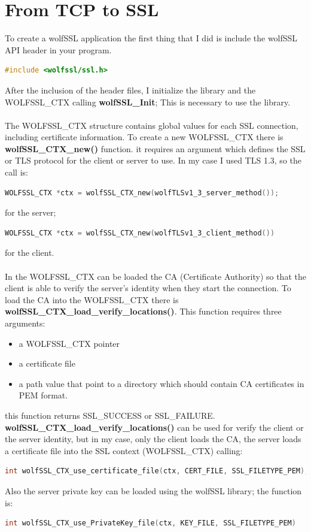 \documentclass[a4paper,12pt]{report}
\begin{document}
\section{From TCP to SSL}
To create a wolfSSL application the first thing that I did is include the wolfSSL API header in your program.
\begin{lstlisting}[language=c]
#include <wolfssl/ssl.h>
\end{lstlisting}
After the inclusion of the header files, I initialize the library and the WOLFSSL\_CTX calling \textbf{wolfSSL\_Init}; This is necessary to use the library.
\\\\ The WOLFSSL\_CTX structure contains global values for each SSL connection, including certificate information.
To create a new WOLFSSL\_CTX there is \textbf{wolfSSL\_CTX\_new()} function. it requires an argument which defines the SSL or TLS protocol for the client or server to use. In my case I used TLS 1.3, so the call is: 
\begin{lstlisting}[language=c]
WOLFSSL_CTX *ctx = wolfSSL_CTX_new(wolfTLSv1_3_server_method());
\end{lstlisting}
for the server;
\begin{lstlisting}[language=c]
WOLFSSL_CTX *ctx = wolfSSL_CTX_new(wolfTLSv1_3_client_method())
\end{lstlisting}
for the client.
\\\\In the WOLFSSL\_CTX can be loaded the CA (Certificate Authority) so that the client is able to verify the server's identity when they start the connection. To load the CA into the WOLFSSL\_CTX there is \\\textbf{wolfSSL\_CTX\_load\_verify\_locations()}. This function requires three arguments:
\begin{itemize}
\item a WOLFSSL\_CTX pointer
\item a certificate file
\item a path value that point to a directory which should contain CA certificates in PEM format.
\end{itemize}
this function returns SSL\_SUCCESS or SSL\_FAILURE.
\\\textbf{wolfSSL\_CTX\_load\_verify\_locations()} can be used for verify the client or the server identity, but in my case, only the client loads the CA, the server loads a certificate file into the SSL context (WOLFSSL\_CTX) calling:
\begin{lstlisting}[language=c]
int wolfSSL_CTX_use_certificate_file(ctx, CERT_FILE, SSL_FILETYPE_PEM);
\end{lstlisting}
Also the server private key can be loaded using the wolfSSL library; the function is:
\begin{lstlisting}[language=c]
int wolfSSL_CTX_use_PrivateKey_file(ctx, KEY_FILE, SSL_FILETYPE_PEM)
\end{lstlisting}
\end{document}
